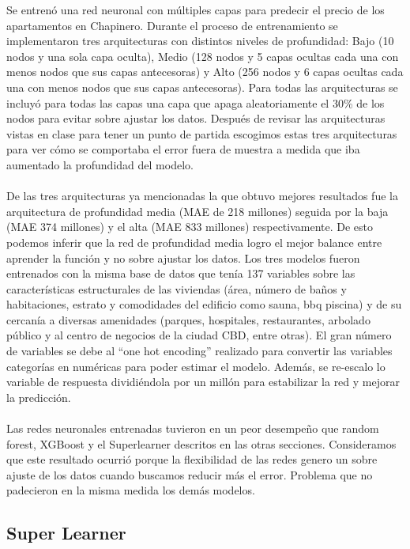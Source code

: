 \documentclass[article,11 pt]{article}
\begin{document}
Se entrenó una red neuronal con múltiples capas para predecir el precio de los apartamentos en Chapinero. Durante el proceso de entrenamiento se implementaron tres arquitecturas con distintos niveles de profundidad: Bajo (10 nodos y una sola capa oculta), Medio (128 nodos y 5 capas ocultas cada una con menos nodos que sus capas antecesoras) y Alto (256 nodos y 6 capas ocultas cada una con menos nodos que sus capas antecesoras). Para todas las arquitecturas se incluyó para todas las capas una capa que apaga aleatoriamente el 30\% de los nodos para evitar sobre ajustar los datos. Después de revisar las arquitecturas vistas en clase para tener un punto de partida escogimos estas tres arquitecturas para ver cómo se comportaba el error fuera de muestra a medida que iba aumentado la profundidad del modelo.
\\
\\
 De las tres arquitecturas ya mencionadas la que obtuvo mejores resultados fue la arquitectura de profundidad media (MAE de 218 millones) seguida por la baja (MAE 374 millones) y el alta (MAE 833 millones) respectivamente. De esto podemos inferir que la red de profundidad media logro el mejor balance entre aprender la función y no sobre ajustar los datos. Los tres modelos fueron entrenados con la misma base de datos que tenía 137 variables sobre las características estructurales de las viviendas (área, número de baños y habitaciones, estrato y comodidades del edificio como sauna, bbq piscina) y de su cercanía a diversas amenidades (parques, hospitales, restaurantes, arbolado público y al centro de negocios de la ciudad CBD, entre otras). El gran número de variables se debe al “one hot encoding” realizado para convertir las variables categorías en numéricas para poder estimar el modelo. Además, se re-escalo lo variable de respuesta dividiéndola por un millón para estabilizar la red y mejorar la predicción. 
\\
\\
Las redes neuronales entrenadas tuvieron en un peor desempeño que random forest, XGBoost y el Superlearner descritos en las otras secciones. Consideramos que este resultado ocurrió porque la flexibilidad de las redes genero un sobre ajuste de los datos cuando buscamos reducir más el error. Problema que no padecieron en la misma medida los demás modelos.  


\subsection{Super Learner}
\end{document}
